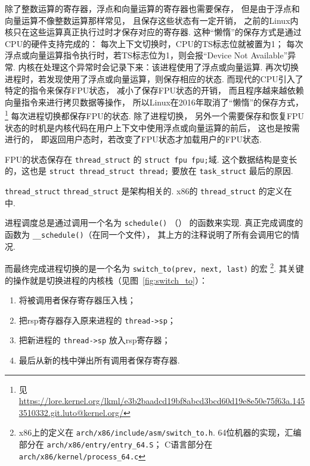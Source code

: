 除了整数运算的寄存器，浮点和向量运算的寄存器也需要保存，
但是由于浮点和向量运算不像整数运算那样常见，
且保存这些状态有一定开销，
之前的Linux内核只在这些运算真正执行过时才保存对应的寄存器.
这种“懒惰”的保存方式是通过CPU的硬件支持完成的：
每次上下文切换时，CPU的TS标志位就被置为1；
每次浮点或向量运算指令执行时，若TS标志位为1，则会报“Device Not Available”异常.
内核在处理这个异常时会记录下来：该进程使用了浮点或向量运算.
再次切换进程时，若发现使用了浮点或向量运算，则保存相应的状态.\cite{bovet2005understanding}
而现代的CPU引入了特定的指令来保存FPU状态，
减小了保存FPU状态的开销，
而且程序越来越依赖向量指令来进行拷贝数据等操作，
所以Linux在2016年取消了“懒惰”的保存方式，
\footnote{见 \url{https://lore.kernel.org/lkml/e3b2baadcd19bf8abcd3bcd60d19e8e50e75f63a.1453510332.git.luto@kernel.org/}}
每次进程切换都保存FPU的状态.
除了进程切换，
另外一个需要保存和恢复FPU状态的时机是内核代码在用户上下文中使用浮点或向量运算的前后，
这也是按需进行的，
即返回用户态时，若改变了FPU状态才加载用户的FPU状态.

FPU的状态保存在 \lstinline{thread_struct} 的 \lstinline{struct fpu fpu;}域.
这个数据结构是变长的，这也是 \lstinline{struct thread_struct thread;}
要放在 \lstinline{task_struct} 最后的原因.

\begin{readsrcbox}{\lstinline{thread_struct}}
	\lstinline{thread_struct} 是架构相关的.
	x86的 \lstinline{thread_struct} 的定义在  中.

	进程调度总是通过调用一个名为 \lstinline{schedule()}
	（） 的函数来实现.
	真正完成调度的函数为 \lstinline{__schedule()}（在同一个文件），
	其上方的注释说明了所有会调用它的情况.

	而最终完成进程切换的是一个名为 \lstinline{switch_to(prev, next, last)} 的宏
	\footnote{x86上的定义在 \lstinline{arch/x86/include/asm/switch_to.h}.
		64位机器的实现，汇编部分在 \lstinline{arch/x86/entry/entry_64.S}；
		C语言部分在 \lstinline{arch/x86/kernel/process_64.c}}.
	其关键的操作就是切换进程的内核栈（见图~\ref{fig:switch_to}）：
	\begin{enumerate}
		\item 将被调用者保存寄存器压入栈；
		\item 把rsp寄存器存入原来进程的 \lstinline{thread->sp}；
		\item 把新进程的 \lstinline{thread->sp} 放入rsp寄存器；
		\item 最后从新的栈中弹出所有调用者保存寄存器.
	\end{enumerate}
\end{readsrcbox}

